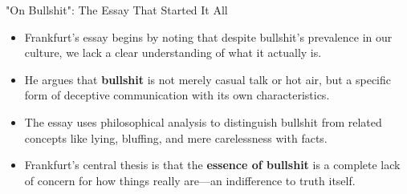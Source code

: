 \documentclass{beamer}
\begin{document}
	\begin{frame}{"On Bullshit": The Essay That Started It All}
		\begin{itemize}
			\item Frankfurt's essay begins by noting that despite bullshit's prevalence in our culture, we lack a clear understanding of what it actually is.
			\item He argues that \textbf{bullshit} is not merely casual talk or hot air, but a specific form of deceptive communication with its own characteristics.
			\item The essay uses philosophical analysis to distinguish bullshit from related concepts like lying, bluffing, and mere carelessness with facts.
			\item Frankfurt's central thesis is that the \textbf{essence of bullshit} is a complete lack of concern for how things really are—an indifference to truth itself.
		\end{itemize}
		
	\end{frame}
	
\end{document}
